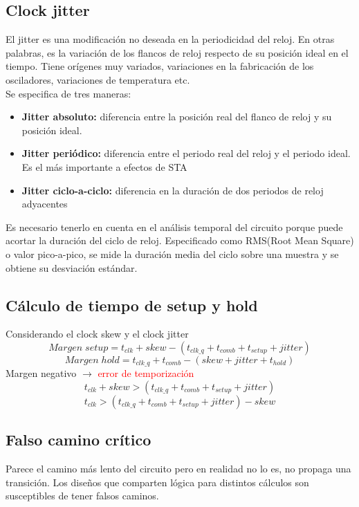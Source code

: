 \subsection{Clock jitter}
El jitter es una modificación no deseada en la periodicidad del reloj. En otras palabras, es la variación de los flancos de reloj respecto de su posición ideal en el tiempo.
Tiene orígenes muy variados, variaciones en la fabricación de los osciladores, variaciones de temperatura etc.\\
Se especifica de tres maneras:
\begin{itemize}
    \item\textbf{Jitter absoluto:} diferencia entre la posición real del flanco de reloj y su posición ideal.
    \item\textbf{Jitter periódico:} diferencia entre el periodo real del reloj y el periodo ideal. Es el más importante a efectos de STA
    \item\textbf{Jitter ciclo-a-ciclo:} diferencia en la duración de dos periodos de reloj adyacentes
\end{itemize}

Es necesario tenerlo en cuenta en el análisis temporal del circuito porque puede acortar la duración del ciclo de reloj. Especificado como RMS(Root Mean Square) o valor pico-a-pico, se mide la duración media del ciclo sobre una muestra y se obtiene su desviación estándar.

\subsection{Cálculo de tiempo de setup y hold}
Considerando el clock skew y el clock jitter
\[
    Margen\; setup = t_{clk} + skew - \left(t_{clk\_q} + t_{comb} + t_{setup} + jitter\right)
\]
\[
    Margen\; hold = t_{clk\_q} + t_{comb} - \left(skew + jitter + t_{hold}\right)
\]
Margen negativo $\rightarrow$ \textcolor{red}{error de temporización}
\[
    t_{clk} + skew > \left(t_{clk\_q} + t_{comb} + t_{setup} + jitter\right)
\]
\[
    t_{clk} > \left(t_{clk\_q} + t_{comb} + t_{setup} + jitter\right) -skew
\]

\subsection{Falso camino crítico}
Parece el camino más lento del circuito pero en realidad no lo es, no propaga una transición. Los diseños que comparten lógica para distintos cálculos son susceptibles de tener falsos caminos.

